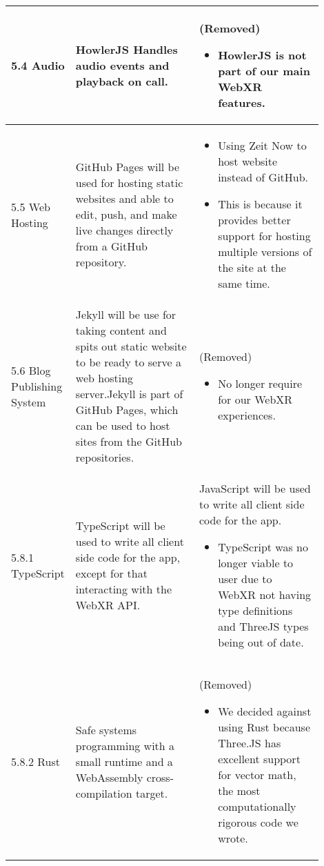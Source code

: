 \documentclass[onecolumn, draftclsnofoot,10pt, compsoc]{IEEEtran}
\begin{document}
\begin{longtable}{ |p{0.1\linewidth}|p{0.4\linewidth}|p{0.4\linewidth}| }
 5.4 Audio
 &  
 HowlerJS Handles audio events and playback on call.

 & 
(Removed)
 \begin{itemize}
     \item HowlerJS is not part of our main WebXR features.
 \end{itemize} \\
 \hline
 
 5.5 Web Hosting
 & 
GitHub Pages will be used for hosting static websites and able to edit, push, and make live changes directly from a GitHub repository.
 & 
 \begin{itemize}
    \item Using Zeit Now to host website instead of GitHub.
    \item This is because it provides better support for hosting multiple versions of the site at the same time.
 \end{itemize} \\
 \hline
 
 5.6 Blog Publishing System
 & Jekyll will be use for taking content and spits out static website to be ready to serve a web hosting server.Jekyll is part of GitHub Pages, which can be used to host sites from the GitHub repositories.

 & 
 (Removed)
 \begin{itemize}
    \item No longer require for our WebXR experiences.
 \end{itemize} \\
 \hline
 
 5.8.1 TypeScript
 &
TypeScript will be used to write all client side code for the app, except for that interacting with the WebXR API.
 & 
JavaScript will be used to write all client side code for the app.
 \begin{itemize}
    \item TypeScript was no longer viable to user due to WebXR not having type definitions and ThreeJS types being out of date.
 \end{itemize} \\
 \hline
 
 5.8.2 Rust
 &
Safe systems programming with a small runtime and a WebAssembly cross-compilation target.
 & 
 (Removed)
 \begin{itemize}
    \item We decided against using Rust because Three.JS has excellent support for vector math, the most computationally rigorous code we wrote. 
 \end{itemize} \\
 \hline
 

\end{longtable}
\end{document}
